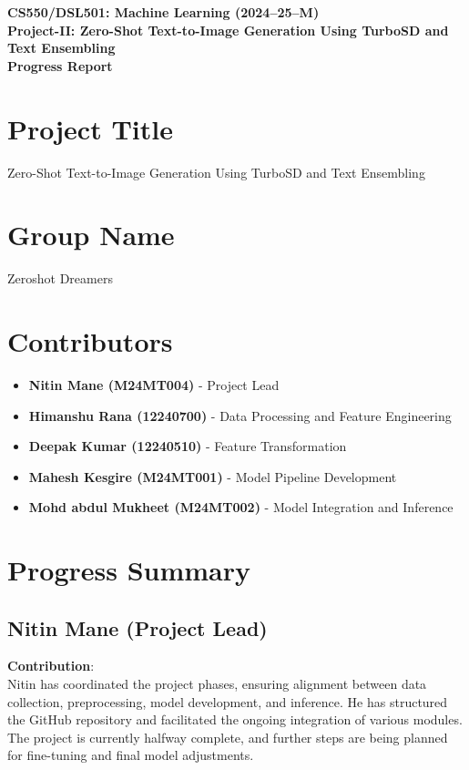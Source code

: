 \documentclass{exam}
\begin{document}
\begin{center}
\textbf{CS550/DSL501: Machine Learning (2024--25--M)} \\
\textbf{Project-II: Zero-Shot Text-to-Image Generation Using TurboSD and Text Ensembling} \\
\textbf{Progress Report}
\end{center}

\vspace{0.2in}

\section{Project Title}
Zero-Shot Text-to-Image Generation Using TurboSD and Text Ensembling

\section{Group Name}
Zeroshot Dreamers

\vspace{0.2in}

\section{Contributors}
\begin{itemize}
    \item \textbf{Nitin Mane (M24MT004)} - Project Lead
    \item \textbf{Himanshu Rana (12240700)} - Data Processing and Feature Engineering
    \item \textbf{Deepak Kumar (12240510)} - Feature Transformation
    \item \textbf{Mahesh Kesgire (M24MT001)} - Model Pipeline Development
    \item \textbf{Mohd abdul Mukheet (M24MT002)} - Model Integration and Inference
\end{itemize}

\vspace{0.2in}

\section{Progress Summary}

\subsection{Nitin Mane (Project Lead)}
\textbf{Contribution}: \\
Nitin has coordinated the project phases, ensuring alignment between data collection, preprocessing, model development, and inference. He has structured the GitHub repository and facilitated the ongoing integration of various modules. The project is currently halfway complete, and further steps are being planned for fine-tuning and final model adjustments.
\end{document}
